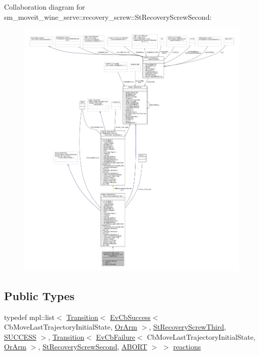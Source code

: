 Collaboration diagram for sm\+\_\+moveit\+\_\+wine\+\_\+serve\+:\+:recovery\+\_\+screw\+:\+:St\+Recovery\+Screw\+Second\+:
\nopagebreak
\begin{figure}[H]
\begin{center}
\leavevmode
\includegraphics[width=350pt]{structsm__moveit__wine__serve_1_1recovery__screw_1_1StRecoveryScrewSecond__coll__graph}
\end{center}
\end{figure}
\subsection*{Public Types}
\begin{DoxyCompactItemize}
\item 
typedef mpl\+::list$<$ \hyperlink{classsmacc_1_1Transition}{Transition}$<$ \hyperlink{structsmacc_1_1EvCbSuccess}{Ev\+Cb\+Success}$<$ Cb\+Move\+Last\+Trajectory\+Initial\+State, \hyperlink{classsm__moveit__wine__serve_1_1OrArm}{Or\+Arm} $>$, \hyperlink{structsm__moveit__wine__serve_1_1recovery__screw_1_1StRecoveryScrewThird}{St\+Recovery\+Screw\+Third}, \hyperlink{structsmacc_1_1default__transition__tags_1_1SUCCESS}{S\+U\+C\+C\+E\+SS} $>$, \hyperlink{classsmacc_1_1Transition}{Transition}$<$ \hyperlink{structsmacc_1_1EvCbFailure}{Ev\+Cb\+Failure}$<$ Cb\+Move\+Last\+Trajectory\+Initial\+State, \hyperlink{classsm__moveit__wine__serve_1_1OrArm}{Or\+Arm} $>$, \hyperlink{structsm__moveit__wine__serve_1_1recovery__screw_1_1StRecoveryScrewSecond}{St\+Recovery\+Screw\+Second}, \hyperlink{structsmacc_1_1default__transition__tags_1_1ABORT}{A\+B\+O\+RT} $>$ $>$ \hyperlink{structsm__moveit__wine__serve_1_1recovery__screw_1_1StRecoveryScrewSecond_a00e1a1cd8c8bf171f2bd685a9693a413}{reactions}
\end{DoxyCompactItemize}
